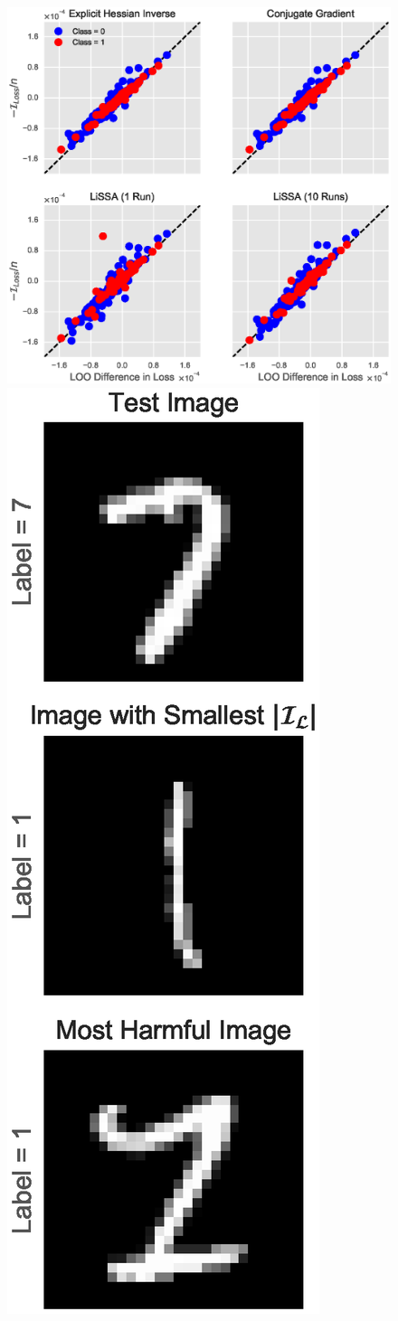 \documentclass{article}
\begin{document}
\begin{figure}[ht]
\vskip 0.0in
\begin{center}
\centerline{\includegraphics[width=1.4\columnwidth]{fig-logit}
\includegraphics[width=0.487\columnwidth]{fig-logit-img}}

\end{center}
\end{figure}
\end{document}
